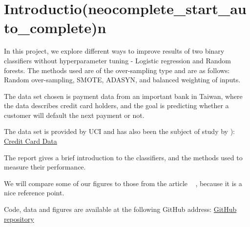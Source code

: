 \section{Introductio(neocomplete_start_auto_complete)n}
In this project, we explore different ways to improve results of two binary
classifiers without hyperparameter tuning - Logistic regression and
Random forests. The methods used are of the over-sampling type and are as
follows: Random over-sampling, SMOTE, ADASYN, and balanced weighting of
inputs.

The data set chosen is payment
data from an important bank in Taiwan, where the data describes credit card 
holders, and the goal is predicting whether a customer will default the 
next payment or not.

The data set is provided by UCI and has also been the subject of study by \cite{ComparisonData}): 
\href{https://archive.ics.uci.edu/ml/datasets/default+of+credit+card+clients}{Credit Card Data}

The report gives a brief introduction to the classifiers, and the methods
used to measure their performance.

We will compare some of our figures to those from the article ~\cite{ComparisonData}
, because it is
a nice reference point. 

Code, data and figures are available at the following GitHub address:
\href{https://github.com/geirtul/fys-stk4155/tree/master/project3}{GitHub repository}


